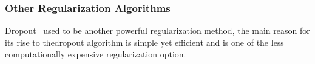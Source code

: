 \subsubsection{Other Regularization Algorithms}

Dropout~\cite{JMLR:v15:srivastava14a} used to be another powerful regularization method, the main reason for its rise to thedropout algorithm is simple yet efficient and is one of the less computationally expensive regularization option. 